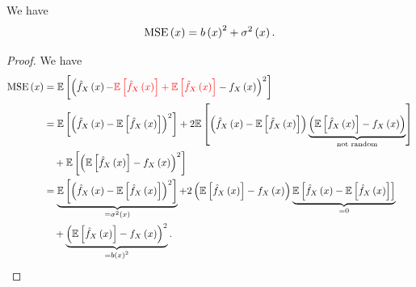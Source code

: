 \begin{proposition}
  We have
  \begin{equation*}
    \mathrm{MSE}\left(x\right) = b\left(x\right)^2 + \sigma^2\left(x\right).
  \end{equation*}
\end{proposition}
\begin{proof}
  We have
  \begin{equation*}
    \begin{split}
      \mathrm{MSE}\left(x\right) & = \mathbb{E}\left[ \left(\hat{f}_X\left(x\right) {\color{red}- \mathbb{E}\left[\hat{f}_X\left(x\right)\right] + \mathbb{E}\left[\hat{f}_X\left(x\right)\right]} - f_X\left(x\right)\right)^2\right]                                                                                              \\
                 & = \mathbb{E}\left[ \left(\hat{f}_X\left(x\right) - \mathbb{E}\left[\hat{f}_X\left(x\right)\right]\right)^2\right] + 2 \mathbb{E}\left[\left(\hat{f}_X\left(x\right)- \mathbb{E}\left[\hat{f}_X\left(x\right)\right]\right)\underbrace{\left(\mathbb{E}\left[\hat{f}_X\left(x\right)\right] - f_X\left(x\right)\right)}_{\text{not random}} \right]             \\
                 & \quad + \mathbb{E}\left[\left(\mathbb{E}\left[\hat{f}_X\left(x\right)\right] - f_X\left(x\right)\right)^2\right]                                                                                                                                                  \\
                 & = \underbrace{\mathbb{E}\left[ \left(\hat{f}_X\left(x\right) - \mathbb{E}\left[\hat{f}_X\left(x\right)\right]\right)^2\right]}_{=\sigma^2\left(x\right)} + 2 \left(\mathbb{E}\left[\hat{f}_X\left(x\right)\right] - f_X\left(x\right)\right) \underbrace{\mathbb{E}\left[\hat{f}_X\left(x\right)- \mathbb{E}\left[\hat{f}_X\left(x\right)\right]\right] }_{=0} \\
                 & \quad + \underbrace{\left(\mathbb{E}\left[\hat{f}_X\left(x\right)\right] - f_X\left(x\right)\right)^2}_{=b\left(x\right)^2}.                                                                                                                               \\
    \end{split}
  \end{equation*}
\end{proof}

